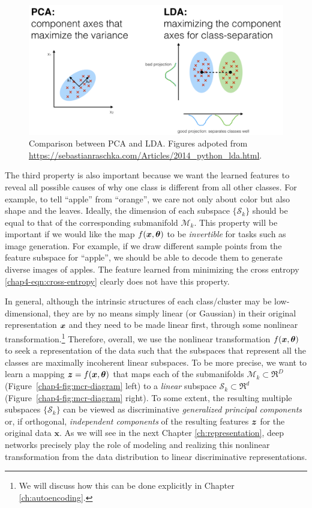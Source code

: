 \documentclass[../../book-main.tex]{subfiles}
\begin{document}
\begin{figure}
	\centering
	\includegraphics[width=0.7\linewidth]{chapters/chapter3/figs/LDA.png}\vspace{-0.1in}
	\caption{Comparison between PCA and LDA. Figures adpoted from \url{https://sebastianraschka.com/Articles/2014_python_lda.html}.}
	\label{fig:LDA}
\end{figure}


The third property is also important because we want the learned features to reveal all possible causes of why one class is different from all other classes. For example, to tell ``apple'' from ``orange'', we care not only about color but also shape and the leaves. Ideally, the dimension of each subspace $\{\mathcal{S}_k\}$ should be equal to that of the corresponding submanifold $\mathcal{M}_k$. This property will be important if we would like the map $f(\bm{x},\bm\theta)$ to be {\em invertible} for tasks such as image generation. For example, if we draw different sample points from the feature subspace for ``apple'', we should be able to decode them to generate diverse images of apples. The feature learned from minimizing the cross entropy \eqref{chap4-eqn:cross-entropy} clearly does not have this property.


In general, although the intrinsic structures of each class/cluster may be low-dimensional, they are by no means simply linear (or Gaussian) in their original representation $\bm{x}$ and they need to be made linear first, through some nonlinear transformation.\footnote{We will discuss how this can be done explicitly in Chapter \ref{ch:autoencoding}.} Therefore, overall, we use the nonlinear transformation $f(\bm{x},\bm\theta)$ to seek a representation of the data such that the subspaces that represent all the classes are maximally incoherent linear subspaces. To be more precise, we want to learn a mapping {$\bm{z} = f(\bm{x},\bm\theta)$} that maps each of the submanifolds $\mathcal{M}_k \subset \Re^D$ (Figure~\ref{chap4-fig:mcr-diagram} left) to a {\em linear} subspace $\mathcal{S}_k \subset \Re^d$ (Figure~\ref{chap4-fig:mcr-diagram} right). To some extent, the resulting multiple subspaces $\{\mathcal{S}_k\}$ can be viewed as discriminative {\em generalized principal components} \cite{GPCA} or, if orthogonal, {\em independent components} \cite{hyvarinen2000independent} of the resulting features $\bm{z}$ for the original data $\bm x$.
As we will see in the next Chapter \ref{ch:representation}, deep networks precisely play the role of modeling and realizing this nonlinear transformation from the data distribution to linear discriminative representations.
\end{document}
